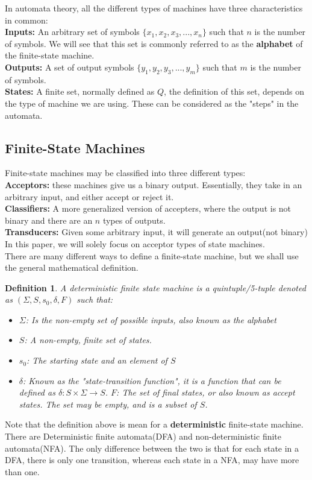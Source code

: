 \documentclass[12pt, letterpaper]{article}
\newtheorem*{defn}{Definition}
\begin{document}
In automata theory, all the different types of machines have three characteristics in common:\\
\textbf{Inputs:} An arbitrary set of symbols $\{ x_1, x_2, x_3, ... , x_n \}$ such that $n$ is the number of symbols. We will see that this set is commonly referred to as the \textbf{alphabet} of the finite-state machine.\\
\textbf{Outputs:} A set of output symbols $\{ y_1, y_2, y_3, ..., y_m \}$ such that $m$ is the number of symbols.\\
\textbf{States:} A finite set, normally defined as $Q$, the definition of this set, depends on the type of machine we are using. These can be considered as the "steps" in the automata.



\subsection{Finite-State Machines}
Finite-state machines may be classified into three different types:\\
\textbf{Acceptors:} these machines give us a binary output. Essentially, they take in an arbitrary input, and either accept or reject it.\\
\textbf{Classifiers:} A more generalized version of accepters, where the output is not binary and there are an $n$ types of outputs.\\
\textbf{Transducers:} Given some arbitrary input, it will generate an output(not binary)\\
In this paper, we will solely focus on acceptor types of state machines.\\

There are many different ways to define a finite-state machine, but we shall use the general mathematical definition.
\begin{defn}
A deterministic finite state machine is a quintuple/5-tuple denoted as $(\Sigma, S, s_0, \delta, F)$ such that:\\
\begin{itemize}
\item $\Sigma$: Is the non-empty set of possible inputs, also known as the alphabet
\item $S$: A non-empty, finite set of states.
\item $s_0$: The starting state and an element of $S$
\item $\delta$: Known as the "state-transition function", it is a function that can be defined as $\delta: S \times \Sigma \rightarrow S$.
$F$: The set of final states, or also known as accept states. The set may be empty, and is a subset of $S$.
\end{itemize} \cite{Ben}

\end{defn}
Note that the definition above is mean for a \textbf{deterministic} finite-state machine. There are Deterministic finite automata(DFA) and non-deterministic finite automata(NFA). The only difference between the two is that for each state in a DFA, there is only one transition, whereas each state in a NFA, may have more than one.\\
\end{document}

